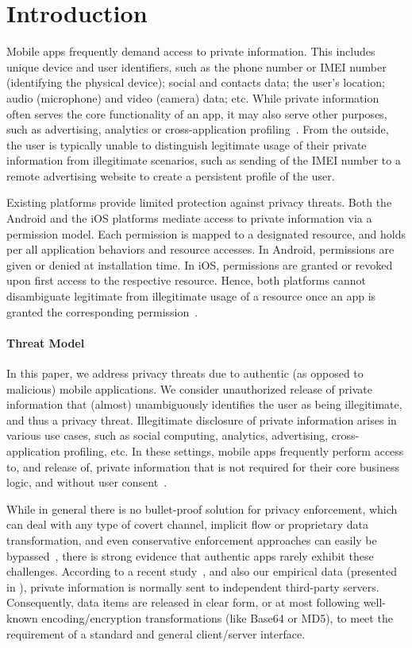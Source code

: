 \section{Introduction}\label{Se:introduction}

Mobile apps frequently demand access to private information. This includes unique device and user identifiers, such as the phone number or IMEI number (identifying the physical device); social and contacts data; the user's location; audio (microphone) and video (camera) data; etc. While private information often serves the core functionality of an app, it may also serve other purposes, such as advertising, analytics or cross-application profiling~\cite{HHJSW:CCS11}. From the outside, the user is typically unable to distinguish legitimate usage of their private information from illegitimate scenarios, such as sending of the IMEI number to a remote advertising website to create a persistent profile of the user. 

Existing platforms provide limited protection against privacy threats. Both the Android and the iOS platforms mediate access to private information via a permission model. Each permission is mapped to a designated resource, and holds per all application behaviors and resource accesses. In Android,  permissions are given or denied at installation time. In iOS, permissions are granted or revoked upon first access to the respective resource. Hence, both platforms cannot disambiguate legitimate from illegitimate usage of a resource once an app is granted the corresponding permission~\cite{HMNRSKZ:ASE13}.

\paragraph{Threat Model} In this paper, we address privacy threats due to authentic (as opposed to malicious) mobile applications. We consider unauthorized release of private information that (almost) unambiguously identifies the user as being illegitimate, and thus a privacy threat. Illegitimate disclosure of private information arises in various use cases, such as social computing, analytics, advertising, cross-application profiling, etc. In these settings, mobile apps frequently perform access to, and release of, private information that is not required for their core business logic, and without user consent~\cite{LJ:SEC13}.

While in general there is no bullet-proof solution for privacy enforcement, which can deal with any type of covert channel, implicit flow or proprietary data transformation, and even conservative enforcement approaches can easily be bypassed~\cite{SMBK:SECRYPT13}, there is strong evidence that authentic apps rarely exhibit these challenges. According to a recent study~\cite{HHJSW:CCS11}, and also our empirical data (presented in ), private information is normally sent to independent third-party servers. Consequently, data items are released in clear form, or at most following well-known encoding/encryption transformations (like Base64 or MD5), to meet the requirement of a standard and general client/server interface. 


